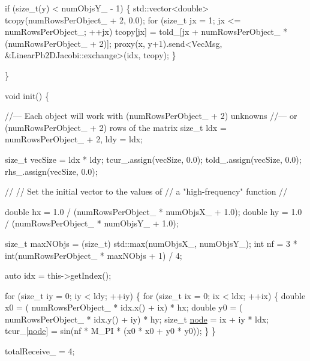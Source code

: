 \begin{DoxyCodeInclude}
    \textcolor{keywordflow}{if} (\textcolor{keywordtype}{size\_t}(y) < numObjsY\_ - 1) \{
      std::vector<double> tcopy(numRowsPerObject\_ + 2, 0.0);
      \textcolor{keywordflow}{for} (\textcolor{keywordtype}{size\_t} jx = 1; jx <= numRowsPerObject\_; ++jx)
        tcopy[jx] = told\_[jx + numRowsPerObject\_ * (numRowsPerObject\_ + 2)];
      proxy(x, y+1).send<VecMsg, &LinearPb2DJacobi::exchange>(idx, tcopy);
    \}

  \}


  \textcolor{keywordtype}{void} init() \{

    \textcolor{comment}{//--- Each object will work with (numRowsPerObject\_ + 2) unknowns}
    \textcolor{comment}{//--- or (numRowsPerObject\_ + 2) rows of the matrix}
    \textcolor{keywordtype}{size\_t} ldx = numRowsPerObject\_ + 2, ldy = ldx;

    \textcolor{keywordtype}{size\_t} vecSize = ldx * ldy;
    tcur\_.assign(vecSize, 0.0);
    told\_.assign(vecSize, 0.0);
    rhs\_.assign(vecSize, 0.0);

    \textcolor{comment}{//}
    \textcolor{comment}{// Set the initial vector to the values of}
    \textcolor{comment}{// a "high-frequency" function}
    \textcolor{comment}{//}

    \textcolor{keywordtype}{double} hx = 1.0 / (numRowsPerObject\_ * numObjsX\_ + 1.0);
    \textcolor{keywordtype}{double} hy = 1.0 / (numRowsPerObject\_ * numObjsY\_ + 1.0);

    \textcolor{keywordtype}{size\_t} maxNObjs = (size\_t) std::max(numObjsX\_, numObjsY\_);
    \textcolor{keywordtype}{int} nf = 3 * int(numRowsPerObject\_ * maxNObjs + 1) / 4;

    \textcolor{keyword}{auto} idx = this->getIndex();

    \textcolor{keywordflow}{for} (\textcolor{keywordtype}{size\_t} iy = 0; iy < ldy; ++iy) \{
      \textcolor{keywordflow}{for} (\textcolor{keywordtype}{size\_t} ix = 0; ix < ldx; ++ix) \{
        \textcolor{keywordtype}{double} x0 = ( numRowsPerObject\_ * idx.x() + ix) * hx;
        \textcolor{keywordtype}{double} y0 = ( numRowsPerObject\_ * idx.y() + iy) * hy;
        \textcolor{keywordtype}{size\_t} \hyperlink{namespacevt_1_1config_a46e57c33bee1b9f1fa95455af86d80e0a576033c81e2ddd03d721ecef3b1b3f81}{node} = ix + iy * ldx;
        tcur\_[\hyperlink{namespacevt_1_1config_a46e57c33bee1b9f1fa95455af86d80e0a576033c81e2ddd03d721ecef3b1b3f81}{node}] = sin(nf * M\_PI * (x0 * x0 + y0 * y0));
      \}
    \}

    totalReceive\_ = 4;


\end{DoxyCodeInclude}
